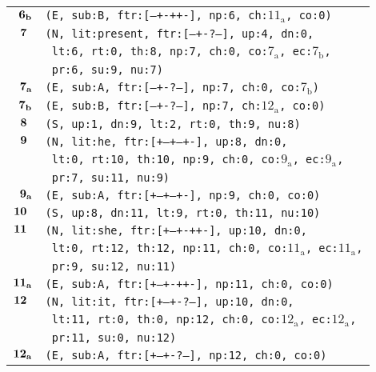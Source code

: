 \documentclass{article}
\begin{document}
\begin{minipage}{\textwidth}
{\begin{tabular}{|r|l|}
    ${\textbf{\textrm{6}}_{\textbf{\textrm{b}}}}$ & \texttt{\texttt{(E,~sub:B,~ftr:[---+-++-],~np:6,~ch:${\textrm{11}_{\textrm{a}}}$,~co:0)}} \\
    ${\textbf{\textrm{7}}_{\phantom{z}}}$ & \texttt{\texttt{(N,~lit:present,~ftr:[---+-?--],~up:4,~dn:0,}} \\
    & \texttt{\texttt{~lt:6,~rt:0,~th:8,~np:7,~ch:0,~co:${\textrm{7}_{\textrm{a}}}$,~ec:${\textrm{7}_{\textrm{b}}}$,}} \\
    & \texttt{\texttt{~pr:6,~su:9,~nu:7)}} \\
    ${\textbf{\textrm{7}}_{\textbf{\textrm{a}}}}$ & \texttt{\texttt{(E,~sub:A,~ftr:[---+-?--],~np:7,~ch:0,~co:${\textrm{7}_{\textrm{b}}}$)}} \\
    ${\textbf{\textrm{7}}_{\textbf{\textrm{b}}}}$ & \texttt{\texttt{(E,~sub:B,~ftr:[---+-?--],~np:7,~ch:${\textrm{12}_{\textrm{a}}}$,~co:0)}} \\
    ${\textbf{\textrm{8}}_{\phantom{z}}}$ & \texttt{\texttt{(S,~up:1,~dn:9,~lt:2,~rt:0,~th:9,~nu:8)}} \\
    ${\textbf{\textrm{9}}_{\phantom{z}}}$ & \texttt{\texttt{(N,~lit:he,~ftr:[+--+--+-],~up:8,~dn:0,}} \\
    & \texttt{\texttt{~lt:0,~rt:10,~th:10,~np:9,~ch:0,~co:${\textrm{9}_{\textrm{a}}}$,~ec:${\textrm{9}_{\textrm{a}}}$,}} \\
    & \texttt{\texttt{~pr:7,~su:11,~nu:9)}} \\
    ${\textbf{\textrm{9}}_{\textbf{\textrm{a}}}}$ & \texttt{\texttt{(E,~sub:A,~ftr:[+--+--+-],~np:9,~ch:0,~co:0)}} \\
    ${\textbf{\textrm{10}}_{\phantom{z}}}$ & \texttt{\texttt{(S,~up:8,~dn:11,~lt:9,~rt:0,~th:11,~nu:10)}} \\
    ${\textbf{\textrm{11}}_{\phantom{z}}}$ & \texttt{\texttt{(N,~lit:she,~ftr:[+--+-++-],~up:10,~dn:0,}} \\
    & \texttt{\texttt{~lt:0,~rt:12,~th:12,~np:11,~ch:0,~co:${\textrm{11}_{\textrm{a}}}$,~ec:${\textrm{11}_{\textrm{a}}}$,}} \\
    & \texttt{\texttt{~pr:9,~su:12,~nu:11)}} \\
    ${\textbf{\textrm{11}}_{\textbf{\textrm{a}}}}$ & \texttt{\texttt{(E,~sub:A,~ftr:[+--+-++-],~np:11,~ch:0,~co:0)}} \\
    ${\textbf{\textrm{12}}_{\phantom{z}}}$ & \texttt{\texttt{(N,~lit:it,~ftr:[+--+-?--],~up:10,~dn:0,}} \\
    & \texttt{\texttt{~lt:11,~rt:0,~th:0,~np:12,~ch:0,~co:${\textrm{12}_{\textrm{a}}}$,~ec:${\textrm{12}_{\textrm{a}}}$,}} \\
    & \texttt{\texttt{~pr:11,~su:0,~nu:12)}} \\
    ${\textbf{\textrm{12}}_{\textbf{\textrm{a}}}}$ & \texttt{\texttt{(E,~sub:A,~ftr:[+--+-?--],~np:12,~ch:0,~co:0)}} \\
    \hline
  \end{tabular}
  }
\end{minipage}
\bigbreak
\end{document}
